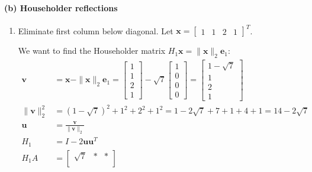 \paragraph{(b) Householder reflections}
\begin{enumerate}
    \item Eliminate first column below diagonal. Let $\mathbf{x} = \begin{bmatrix} 1 & 1 & 2 & 1 \end{bmatrix}^T$.

          We want to find the Householder matrix $H_1\mathbf{x} = \|\mathbf{x}\|_2 \mathbf{e}_1$:
          \begin{align*}
              \mathbf{v}         & = \mathbf{x} - \|\mathbf{x}\|_2 \mathbf{e}_1 = \begin{bmatrix} 1 \\ 1 \\ 2 \\ 1 \end{bmatrix} - \sqrt{7} \begin{bmatrix} 1 \\ 0 \\ 0 \\ 0 \end{bmatrix} = \begin{bmatrix} 1 - \sqrt{7} \\ 1 \\ 2 \\ 1 \end{bmatrix} \\
              \|\mathbf{v}\|_2^2 & = (1-\sqrt{7})^2 + 1^2 + 2^2 + 1^2  = 1 - 2\sqrt{7} + 7 + 1 + 4 + 1 = 14 - 2\sqrt{7}                                                                                                                                \\
              \mathbf{u}         & = \frac{\mathbf{v}}{\|\mathbf{v}\|_2}                                                                                                                                                                               \\
              H_1                & = I - 2\mathbf{u}\mathbf{u}^T                                                                                                                                                                                       \\
              H_1 A              & = \begin{bmatrix}
                                         \sqrt{7} & * & * \\

\end{bmatrix}
\end{align*}
\end{enumerate}
